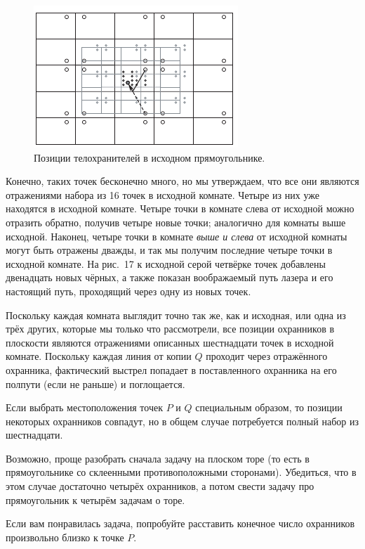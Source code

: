 \begin{figure}[b!]
\centering
\includegraphics[scale=1]{pics/room3}
\caption{Позиции телохранителей в исходном прямоугольнике.}
\label{pic:room3}
\end{figure}

Конечно, таких точек бесконечно много, но мы утверждаем, что все они являются отражениями набора из 16 точек в исходной комнате.
Четыре из них уже находятся в исходной комнате.
Четыре точки в комнате слева от исходной можно отразить обратно, получив четыре новые точки; аналогично для комнаты выше исходной.
Наконец, четыре точки в комнате \emph{выше и слева} от исходной комнаты могут быть отражены дважды, и так мы получим последние четыре точки в исходной комнате.
На рис.~17 к исходной серой четвёрке точек добавлены двенадцать новых чёрных,
а также показан воображаемый путь лазера и его настоящий путь, проходящий через одну из новых точек.

Поскольку каждая комната выглядит точно так же, как и исходная, или одна из трёх других, которые мы только что рассмотрели, все позиции охранников в плоскости являются отражениями описанных шестнадцати точек в исходной комнате.
Поскольку каждая линия от копии $Q$ проходит через отражённого охранника, фактический выстрел попадает в поставленного охранника на его полпути (если не раньше) и поглощается.

Если выбрать местоположения точек $P$ и $Q$ специальным образом, то позиции некоторых охранников совпадут, но в общем случае потребуется полный набор из шестнадцати.

\begin{addedbytheeditors}
Возможно, проще разобрать сначала задачу на плоском торе (то есть в прямоугольнике со склеенными противоположными сторонами).
Убедиться, что в этом случае достаточно четырёх охранников, а потом свести   задачу про прямоугольник к четырём задачам о торе.

Если вам понравилась задача, попробуйте расставить конечное число охранников произвольно близко к точке $P$.\pr
\end{addedbytheeditors}



